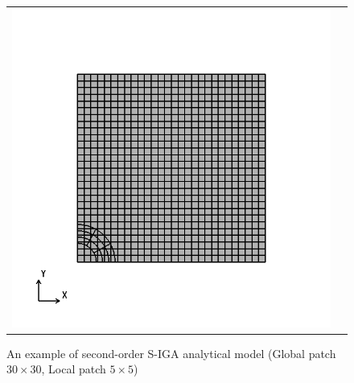 \begin{figure}[htbp]
  \begin{tabular}{cc}
    \begin{minipage}[t]{0.45\hsize}
      \centering
      \includegraphics[keepaspectratio, scale=0.3]
      {fig/result_data_etc/s-iga02/model/5x5.png}
      \caption{An example of second-order S-IGA analytical model (Global patch $30\times 30$, Local patch $5\times 5$)}
      \label{fig:s-iga02 model01}
    \end{minipage} &
    \begin{minipage}[t]{0.45\hsize}
      \centering
      \includegraphics[keepaspectratio, scale=0.3]

\end{minipage}
\end{tabular}
\end{figure}
